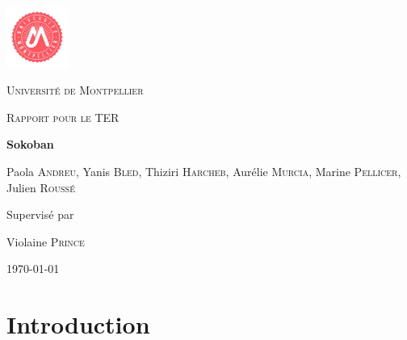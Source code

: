 \documentclass[english,11pt]{report}
\begin{document}
\begin{titlepage}
	\centering
	\includegraphics[width=0.15\textwidth]{univ}\par\vspace{1cm}
	{\scshape\LARGE Université de Montpellier \par}
	\vspace{1cm}
	{\scshape\Large Rapport pour le TER\par}
	\vspace{1.5cm}
	{\huge\bfseries Sokoban\par}
	\vspace{2cm}
	{\Large Paola \textsc{Andreu}, Yanis \textsc{Bled}, Thiziri \textsc{Harcheb}, Aurélie \textsc{Murcia}, Marine \textsc{Pellicer}, Julien \textsc{Roussé}}

	\vfill
	
	{\Large Supervisé par\par}
	\vspace{0.2cm}
	{\Large Violaine \textsc{Prince}}
	
	\vfill


	{\large \today\par}
\end{titlepage}


\tableofcontents


\chapter*{Introduction}
\end{document}
